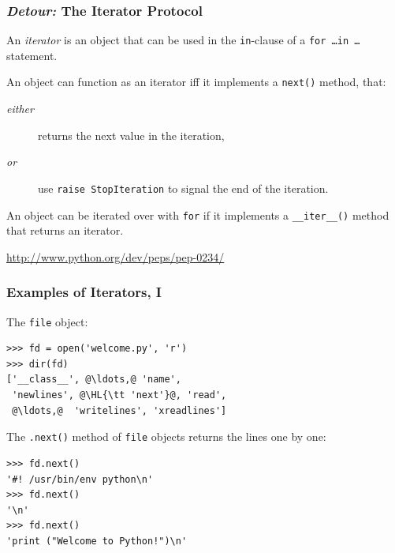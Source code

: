 \documentclass[english,serif,mathserif,xcolor=pdftex,dvipsnames,table]{beamer}
\begin{document}




\begin{frame}[fragile]
  \frametitle{\emph{Detour:} The Iterator Protocol}

  An \emph{iterator} is an object that can be used in the
  \texttt{in}-clause of a \texttt{for \ldots in \ldots} statement.

  \+
  An object can function as an iterator iff it implements a
  \texttt{next()} method, that:
  \begin{description}
  \item[\emph{either}] returns the next value in the iteration,
  \item[\emph{or}] use \lstinline|raise StopIteration| to signal the
    end of the iteration.
  \end{description}

  \+
  An object can be iterated over with \lstinline|for| if it implements a
  \lstinline|__iter__()| method that returns an iterator.

  \begin{references}
    \url{http://www.python.org/dev/peps/pep-0234/}
  \end{references}
\end{frame}


\begin{frame}[fragile]
  \frametitle{Examples of Iterators, I}

  The \texttt{file} object:
\begin{lstlisting}
>>> fd = open('welcome.py', 'r')
>>> dir(fd)
['__class__', @\ldots,@ 'name',
 'newlines', @\HL{\tt 'next'}@, 'read',
 @\ldots,@  'writelines', 'xreadlines']
\end{lstlisting}

  \+
  The \texttt{.next()} method of \texttt{file} objects returns the
  lines one by one:
\begin{lstlisting}
>>> fd.next()
'#! /usr/bin/env python\n'
>>> fd.next()
'\n'
>>> fd.next()
'print ("Welcome to Python!")\n'
\end{lstlisting}

\end{frame}
\end{document}
